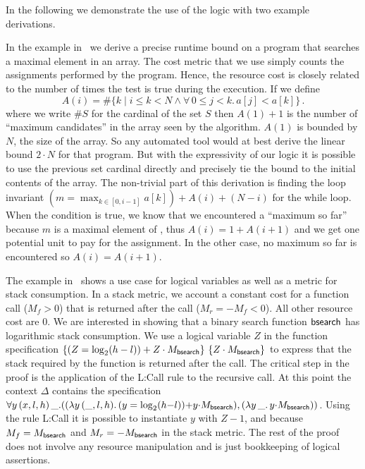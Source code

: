 \documentclass{sigplanconf}
\newcommand{\pref}[1]{\prettyref{#1}}
\begin{document}
{In the following we demonstrate the use of the logic with two example
derivations.

In the example in~\pref{fig:xmplmax} we derive a precise runtime
bound on a program that searches a maximal element in an array.  The
cost metric that we use simply counts the assignments performed by the
program.  Hence, the resource cost is closely related to the
number of times the test  is true during the
execution.
%
If we define
$$
 A(i) =  \# \{ k \mid i \le k < N \land \forall\, 0 \le j < k.\, a[j] < a[k] \} \, .
$$
where we write $\# S$ for the cardinal of the set $S$ then $A(1)+1$ is
the number of ``maximum candidates'' in the array  seen
by the algorithm. $A(1)$ is bounded by $N$, the size of the array.
So any automated tool would at best derive the linear bound $2 \cdot
N$ for that program.  But with the expressivity of our logic it is
possible to use the previous set cardinal directly and precisely tie
the bound to the initial contents of the array.
%
The non-trivial part of this derivation is finding the loop invariant
$(m = \max_{k \in [0, i-1]} a[k]) + A(i) + (N-i)$ for the while loop.
When the condition  is true, we know that we
encountered a ``maximum so far'' because $m$ is a maximal element of
, thus $A(i) = 1 + A(i+1)$ and we get one
potential unit to pay for the assignment.  In the other case, no
maximum so far is encountered so $A(i) = A(i+1)$.

The example in~\pref{fig:xmplbs} shows a use case for logical
variables as well as a metric for stack consumption. In a stack
metric, we account a constant cost for a function call ($M_f>0$) that
is returned after the call ($M_r = -M_f <0$).  All other resource cost
are $0$.  We are interested in showing that a binary search function
$\mathsf{bsearch}$ has logarithmic stack consumption.  We use a logical
variable $Z$ in the function specification $\{(Z = \log_2(h-l))
  + Z \cdot M_{\mathsf{bsearch}}\}\, \, \{Z \cdot M_{\mathsf{bsearch}}\}$ to express that the stack required by the
function is returned after the call.
%
The critical step in the proof is the application of the
{\sc L:Call} rule to the recursive call.  At this point
the context $\Delta$ contains the specification
$
  \forall y \, (x,l,h) \, \_.
  ( (\lambda y \, (\_, l, h) .\, (y = \log_2(h {-} l)) {+} y {\cdot} M_{\mathsf{bsearch}})
  , (\lambda y \, \_ .\, y {\cdot} M_{\mathsf{bsearch}})
  )
$.
%
Using the rule {\sc L:Call} it is possible to instantiate $y$ with $Z
- 1$, and because $M_f = M_{\mathsf{bsearch}}$ and $M_r =
-M_{\mathsf{bsearch}}$ in the stack metric.  The rest of the proof does
not involve any resource manipulation and is just bookkeeping of
logical assertions.



}
\end{document}
